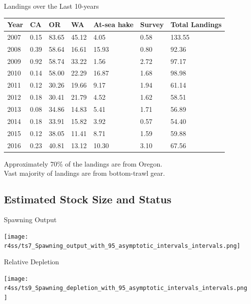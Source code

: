\documentclass[pdf]{beamer}\usepackage[]{graphicx}\usepackage[]{color}
\begin{document}
\begin{frame}{Landings over the Last 10-years}
  \begin{table}[ht]
  \centering
  \begin{tabular}{p{0.4in}p{0.4in}p{0.4in}p{0.4in}p{0.4in}p{0.4in}p{0.6in}}
  Year & CA & OR & WA & At-sea hake & Survey & Total Landings \\ 
  \hline
  2007 & 0.15 & 83.65 & 45.12 & 4.05 & 0.58 & 133.55 \\ 
  2008 & 0.39 & 58.64 & 16.61 & 15.93 & 0.80 & 92.36 \\ 
  2009 & 0.92 & 58.74 & 33.22 & 1.56 & 2.72 & 97.17 \\ 
  2010 & 0.14 & 58.00 & 22.29 & 16.87 & 1.68 & 98.98 \\ 
  2011 & 0.12 & 30.26 & 19.66 & 9.17 & 1.94 & 61.14 \\ 
  2012 & 0.18 & 30.41 & 21.79 & 4.52 & 1.62 & 58.51 \\ 
  2013 & 0.08 & 34.86 & 14.83 & 5.41 & 1.71 & 56.89 \\ 
  2014 & 0.18 & 33.91 & 15.82 & 3.92 & 0.57 & 54.40 \\ 
  2015 & 0.12 & 38.05 & 11.41 & 8.71 & 1.59 & 59.88 \\ 
  2016 & 0.23 & 40.81 & 13.12 & 10.30 & 3.10 & 67.56 \\ 
  \hline
  \end{tabular}
  \end{table}
  Approximately 70\% of the landings are from Oregon.\\
  Vast majority of landings are from bottom-trawl gear.
\end{frame}


\subsection{Estimated Stock Size and Status}
\begin{frame}{Spawning Output}
  \begin{center}
    \texttt{[image: r4ss/ts7\_Spawning\_output\_with\_95\_asymptotic\_intervals\_intervals.png]}
  \end{center}
\end{frame}


\begin{frame}{Relative Depletion}
  \begin{center}
    \texttt{[image: r4ss/ts9\_Spawning\_depletion\_with\_95\_asymptotic\_intervals\_intervals.png]}
  \end{center}
\end{frame}
\end{document}
